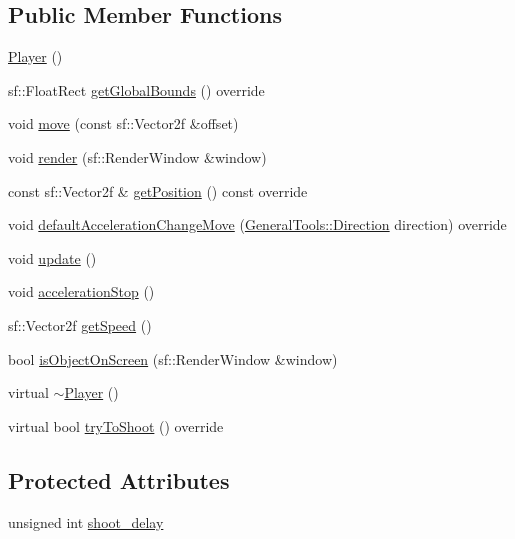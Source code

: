 \subsection*{Public Member Functions}
\begin{DoxyCompactItemize}
\item 
\hyperlink{class_player_affe0cc3cb714f6deb4e62f0c0d3f1fd8}{Player} ()
\item 
sf\+::\+Float\+Rect \hyperlink{class_player_ac2b21f8a74b6b1c0e9068a82e7e71e86}{get\+Global\+Bounds} () override
\item 
void \hyperlink{class_player_a0512220b727eb0cdc6e7d7141b13c7fd}{move} (const sf\+::\+Vector2f \&offset)
\item 
void \hyperlink{class_player_a53938857e80374e79726309e78d1c15c}{render} (sf\+::\+Render\+Window \&window)
\item 
const sf\+::\+Vector2f \& \hyperlink{class_player_abbd4bab9c1c4f881b268b37c3f810bd0}{get\+Position} () const override
\item 
void \hyperlink{class_player_a48e3ad0f384cd58a64136a40d4a04b76}{default\+Acceleration\+Change\+Move} (\hyperlink{namespace_general_tools_afedc3bd242369903830dec92c3ad569b}{General\+Tools\+::\+Direction} direction) override
\item 
void \hyperlink{class_player_a82c3476f3e65a4e2ac6bcd040771bdd4}{update} ()
\item 
void \hyperlink{class_player_a0dce6ea2c5edb142604fc128b2bd9840}{acceleration\+Stop} ()
\item 
sf\+::\+Vector2f \hyperlink{class_player_abcb3bd2717548668a7c3e5873819c3b2}{get\+Speed} ()
\item 
bool \hyperlink{class_player_ac2c0f9ac6f1d4908465a23f9ddb4cb1c}{is\+Object\+On\+Screen} (sf\+::\+Render\+Window \&window)
\item 
virtual \hyperlink{class_player_a749d2c00e1fe0f5c2746f7505a58c062}{$\sim$\+Player} ()
\item 
virtual bool \hyperlink{class_player_a52486292c25bc6ac6589423ef0c81b0e}{try\+To\+Shoot} () override
\end{DoxyCompactItemize}
\subsection*{Protected Attributes}
\begin{DoxyCompactItemize}
\item 
unsigned int \hyperlink{class_player_ab6e35dfaece8703f3906fc3a09d61078}{shoot\+\_\+delay}
\end{DoxyCompactItemize}
